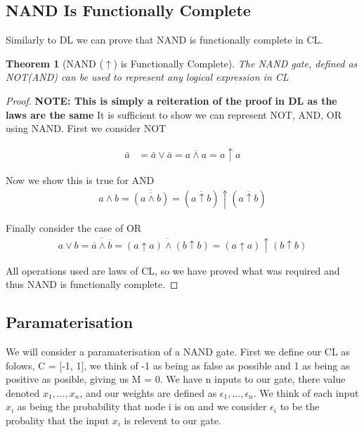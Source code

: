\documentclass{article}
\newtheorem{theorem}{Theorem}
\begin{document}
\subsection{NAND Is Functionally Complete}
Similarly to DL we can prove that NAND is functionally complete in CL.

\begin{theorem}[NAND ($\uparrow$) is Functionally Complete]
The NAND gate, defined as NOT(AND) can be used to represent any logical expression in CL
\end{theorem}

\begin{proof}
\textbf{NOTE: This is simply a reiteration of the proof in DL as the laws are the same}
It is sufficient to show we can represent NOT, AND, OR using NAND. First we consider NOT

\begin{align*}
\bar{a} &= \bar{a} \lor \bar{a} = \overline{a \land a} = a \uparrow a
\end{align*}

Now we show this is true for AND
\begin{align*}
a \land b = \overline{(\overline{a \land b})} = (\overline{a \uparrow b}) \uparrow (\overline{a \uparrow b})
\end{align*}

Finally consider the case of OR
\begin{align*}
a \lor b = \overline{\overline{a} \land \overline{b}} = \overline{(a \uparrow a) \land (b \uparrow b)} = (a \uparrow a) \uparrow (b \uparrow b)
\end{align*}

All operations used are laws of CL, so we have proved what was required and thus NAND is functionally complete.
\end{proof}

\subsection{Paramaterisation}
We will consider a paramaterisation of a NAND gate. First we define our CL as folows, C = [-1, 1], we think of -1 as being as false as possible and 1 as being as positive as posible, giving us M = 0. We have n inputs to our gate, there value denoted $x_1, ..., x_n$, and our weights are defined as $\epsilon_1, ..., \epsilon_n$. We think of each input $x_i$ as being the probability that node i is on and we consider $\epsilon_i$ to be the probality that the input $x_i$ is relevent to our gate.\\
\end{document}
